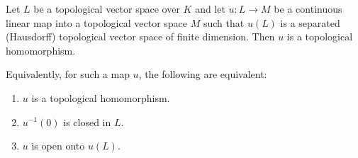 Let $L$ be a topological vector space over $K$ and let $u: L \to M$ be a continuous linear map into a topological vector space $M$ such that $u(L)$ is a separated (Hausdorff) topological vector space of finite dimension. Then $u$ is a topological homomorphism.

Equivalently, for such a map $u$, the following are equivalent:
\begin{enumerate}
\item[(a)] $u$ is a topological homomorphism.
\item[(b)] $u^{-1}(0)$ is closed in $L$.
\item[(c)] $u$ is open onto $u(L)$.
\end{enumerate}

